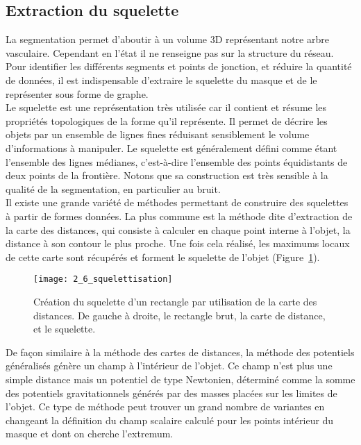 \subsection{Extraction du squelette}	
\label{ss:skel}
La segmentation permet d’aboutir à un volume 3D représentant notre arbre vasculaire. Cependant en l’état il ne renseigne pas sur la structure du réseau. Pour identifier les différents segments et points de jonction, et réduire la quantité de données, il est indispensable d’extraire le squelette du masque et de le représenter sous forme de graphe. \\

Le squelette est une représentation très utilisée car il contient et résume les propriétés topologiques de la forme qu’il représente. Il permet  de décrire les objets par un ensemble de lignes fines réduisant sensiblement le volume d’informations à manipuler. Le squelette est généralement défini comme étant l’ensemble des lignes médianes, c’est-à-dire l’ensemble des points équidistants de deux points de la frontière. Notons que sa construction est très sensible à la qualité de la segmentation, en particulier au bruit.  \\

Il existe une grande variété de méthodes permettant de construire des squelettes à partir de formes données. La plus commune est la méthode dite d’extraction de la carte des distances, qui consiste à calculer en chaque point interne à l’objet, la distance à son contour le plus proche. Une fois cela réalisé, les maximums locaux de cette carte sont récupérés et forment le squelette de l’objet (Figure~\ref{fig:2_6_squelettisation}). 
\begin{figure}[!b]
\centering
\texttt{[image: 2\_6\_squelettisation]}
\caption{Création du squelette d'un rectangle par utilisation de la carte des distances. De gauche à droite, le rectangle brut, la carte de distance, et le squelette.}
\label{fig:2_6_squelettisation}	
\end{figure}	

De façon similaire à la méthode des cartes de distances, la méthode des potentiels généralisés génère un champ à l’intérieur de l’objet. Ce champ n’est plus une simple distance mais un potentiel de type Newtonien, déterminé comme la somme des potentiels gravitationnels générés par des masses placées sur les limites de l’objet. Ce type de méthode peut trouver un grand nombre de variantes en changeant la définition du champ scalaire calculé pour les points intérieur du masque et dont on cherche l’extremum. \\

